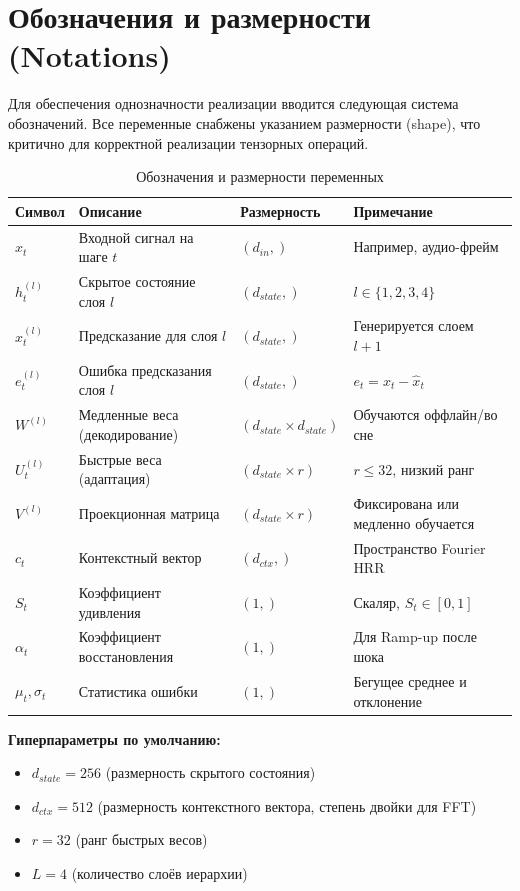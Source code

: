 \section{Обозначения и размерности (Notations)}

Для обеспечения однозначности реализации вводится следующая система обозначений. Все переменные снабжены указанием размерности (shape), что критично для корректной реализации тензорных операций.

\begin{table}[h]
\centering
\caption{Обозначения и размерности переменных}
\label{tab:notations}
\begin{tabular}{lllp{4cm}}
\toprule
\textbf{Символ} & \textbf{Описание} & \textbf{Размерность} & \textbf{Примечание} \\
\midrule
$x_t$ & Входной сигнал на шаге $t$ & $(d_{in},)$ & Например, аудио-фрейм \\
$h_t^{(l)}$ & Скрытое состояние слоя $l$ & $(d_{state},)$ & $l \in \{1, 2, 3, 4\}$ \\
$\hat{x}_t^{(l)}$ & Предсказание для слоя $l$ & $(d_{state},)$ & Генерируется слоем $l+1$ \\
$e_t^{(l)}$ & Ошибка предсказания слоя $l$ & $(d_{state},)$ & $e_t = x_t - \hat{x}_t$ \\
$W^{(l)}$ & Медленные веса (декодирование) & $(d_{state} \times d_{state})$ & Обучаются оффлайн/во сне \\
$U_t^{(l)}$ & Быстрые веса (адаптация) & $(d_{state} \times r)$ & $r \leq 32$, низкий ранг \\
$V^{(l)}$ & Проекционная матрица & $(d_{state} \times r)$ & Фиксирована или медленно обучается \\
$c_t$ & Контекстный вектор & $(d_{ctx},)$ & Пространство Fourier HRR \\
$S_t$ & Коэффициент удивления & $(1,)$ & Скаляр, $S_t \in [0, 1]$ \\
$\alpha_t$ & Коэффициент восстановления & $(1,)$ & Для Ramp-up после шока \\
$\mu_t, \sigma_t$ & Статистика ошибки & $(1,)$ & Бегущее среднее и отклонение \\
\bottomrule
\end{tabular}
\end{table}

\textbf{Гиперпараметры по умолчанию:}
\begin{itemize}
    \item $d_{state} = 256$ (размерность скрытого состояния)
    \item $d_{ctx} = 512$ (размерность контекстного вектора, степень двойки для FFT)
    \item $r = 32$ (ранг быстрых весов)
    \item $L = 4$ (количество слоёв иерархии)
\end{itemize}


